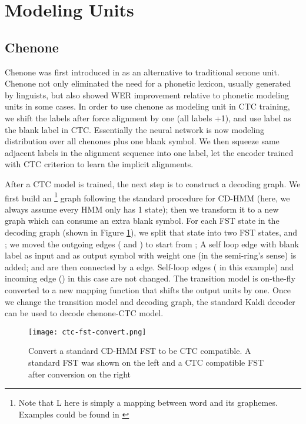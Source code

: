 \documentclass[a4paper]{article}
\begin{document}
\section{Modeling Units}

\subsection{Chenone}
\label{sec:chenone}

Chenone was first introduced in \cite{le2019senones} as an alternative to traditional senone \cite{dahl2011context} unit. Chenone not only eliminated the need for a phonetic lexicon, usually generated by linguists, but also showed WER improvement relative to phonetic modeling units in some cases. In order to use chenone as modeling unit in CTC training, we shift the labels after force alignment by one (all labels +1), and use label  as the blank label in CTC. Essentially the neural network is now modeling distribution over all chenones plus one blank symbol. We then squeeze same adjacent labels in the alignment sequence into one label, let the encoder trained with CTC criterion to learn the implicit alignments. 

After a CTC model is trained, the next step is to construct a decoding graph. We first build an \footnote{Note that L here is simply a mapping between word and its graphemes. Examples could be found in \cite{le2019senones}}  graph following the standard procedure for CD-HMM (here, we always assume every HMM only has 1 state); then we transform it to a new graph which can consume an extra blank symbol. For each FST state  in the decoding graph (shown in Figure \ref{fig:ctc_fst_convert}), we split that state into two FST states,  and ; we moved the outgoing edges ( and ) to start from ; A self loop edge with blank label as input and  as output symbol with weight one (in the semi-ring's sense) is added;  and  are then connected by a  edge. Self-loop edges ( in this example) and incoming edge () in this case are not changed. The transition model is on-the-fly converted to a new mapping function that shifts the output units by one. Once we change the transition model and decoding graph, the standard Kaldi decoder can be used to decode chenone-CTC model.

\vspace{-1em}
\begin{figure}[hhh]
    \centering
    \texttt{[image: ctc-fst-convert.png]}
    \caption{Convert a standard CD-HMM FST to be CTC compatible. A standard FST was shown on the left and a CTC compatible FST after conversion on the right}
    \label{fig:ctc_fst_convert}
\end{figure}
\vspace{-1.5em}
\end{document}
